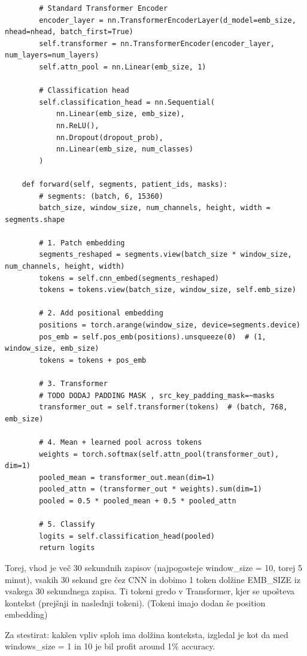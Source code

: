 \begin{verbatim}
        # Standard Transformer Encoder
        encoder_layer = nn.TransformerEncoderLayer(d_model=emb_size, nhead=nhead, batch_first=True)
        self.transformer = nn.TransformerEncoder(encoder_layer, num_layers=num_layers)
        self.attn_pool = nn.Linear(emb_size, 1)

        # Classification head
        self.classification_head = nn.Sequential(
            nn.Linear(emb_size, emb_size),
            nn.ReLU(),
            nn.Dropout(dropout_prob),
            nn.Linear(emb_size, num_classes)
        )

    def forward(self, segments, patient_ids, masks):
        # segments: (batch, 6, 15360)
        batch_size, window_size, num_channels, height, width = segments.shape

        # 1. Patch embedding
        segments_reshaped = segments.view(batch_size * window_size, num_channels, height, width)
        tokens = self.cnn_embed(segments_reshaped)
        tokens = tokens.view(batch_size, window_size, self.emb_size)

        # 2. Add positional embedding
        positions = torch.arange(window_size, device=segments.device)
        pos_emb = self.pos_emb(positions).unsqueeze(0)  # (1, window_size, emb_size)
        tokens = tokens + pos_emb

        # 3. Transformer
        # TODO DODAJ PADDING MASK , src_key_padding_mask=~masks
        transformer_out = self.transformer(tokens)  # (batch, 768, emb_size)

        # 4. Mean + learned pool across tokens
        weights = torch.softmax(self.attn_pool(transformer_out), dim=1)
        pooled_mean = transformer_out.mean(dim=1)
        pooled_attn = (transformer_out * weights).sum(dim=1)
        pooled = 0.5 * pooled_mean + 0.5 * pooled_attn

        # 5. Classify
        logits = self.classification_head(pooled)
        return logits
\end{verbatim}

Torej, vhod je več 30 sekundnih zapisov (najpogosteje window\_size = 10, torej 5 minut),
vsakih 30 sekund gre čez CNN in dobimo 1 token dolžine EMB\_SIZE iz vsakega 30 sekundnega zapisa.
Ti tokeni gredo v Transformer, kjer se upošteva kontekst (prejšnji in naslednji tokeni). (Tokeni imajo dodan še position embedding)

Za stestirat: kakšen vpliv sploh ima dolžina konteksta, izgledal je kot da med windows\_size = 1 in 10 je 
bil profit around 1\% accuracy.

